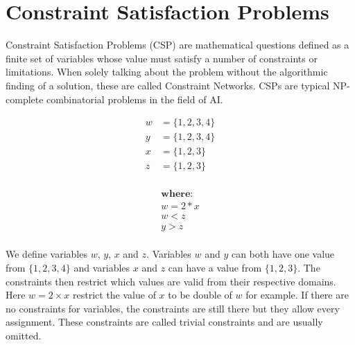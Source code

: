 \chapter{Constraint Satisfaction Problems}

Constraint Satisfaction Problems (CSP) \cite{csp:1987} are mathematical questions defined as a finite set of variables whose value must satisfy a number of constraints or limitations. When solely talking about the problem without the algorithmic finding of a solution, these are called Constraint Networks. CSPs are typical NP-complete combinatorial problems in the field of AI.

\begin{tcolorbox}[title=Example:]
	\begin{multicols}{2}
		\begin{equation*}
			\begin{aligned}
				w & = \{1, 2, 3, 4\} \\
				y & = \{1, 2, 3, 4\} \\
				x & = \{1, 2, 3\}    \\
				z & = \{1, 2, 3\}    \\
			\end{aligned}
		\end{equation*}

		\columnbreak

		\noindent
		\begin{equation*}
			\begin{aligned}
				\textbf{where:} \\
				w = 2*x         \\
				w < z           \\
				y > z           \\
			\end{aligned}
		\end{equation*}
	\end{multicols}
\end{tcolorbox}

We define variables $w$, $y$, $x$ and $z$. Variables $w$ and $y$ can both have one value from $\{1, 2, 3, 4\}$ and variables $x$ and $z$ can have a value from $\{1, 2, 3\}$. The constraints then restrict which values are valid from their respective domains. Here $w = 2 \times x$ restrict the value of $x$ to be double of $w$ for example. If there are no constraints for variables, the constraints are still there but they allow every assignment. These constraints are called trivial constraints and are usually omitted.

